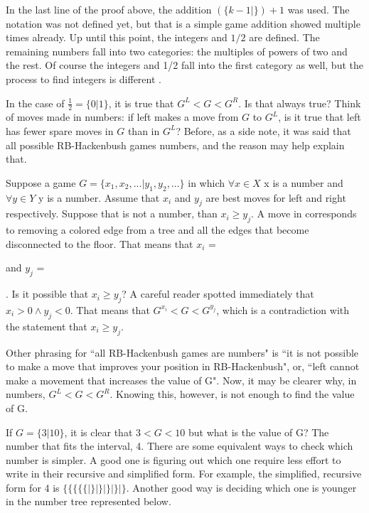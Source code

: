 In the last line of the proof above, the addition $(\{k-1 |\}) + 1$ was used. The notation was not defined yet, but that is a simple game addition showed multiple times already. Up until this point, the integers and $1/2$ are defined. The remaining numbers fall into two categories: the multiples of powers of two and the rest. Of course the integers and 1/2 fall into the first category as well, but the process to find integers is different .

In the case of $\frac{1}{2} = \{0 | 1\}$, it is true that $G^L < G < G^R$. Is that always true? Think of moves made in numbers: if left makes a move from $G$ to $G^L$, is it true that left has fewer spare moves in $G$ than in $G^L$? Before, as a side note, it was said that all possible RB-Hackenbush games numbers, and the reason may help explain that.

Suppose a game $G = \{x_1, x_2,... | y_1, y_2, ...\}$ in which $\forall x \in X$ x  is a number and $\forall y \in Y$ y is a number. Assume that $x_i$ and $y_j$ are best moves for left and right respectively. Suppose that \Gm{} is not a number, than $x_i \ge y_j$. A move in \Gm corresponds to removing a colored edge from a tree and all the edges that become disconnected to the floor. That means that $x_i$ = 
 and $y_j$ =
. Is it possible that $x_i \ge y_j$? A careful reader spotted immediately that $x_i > 0 \land y_j < 0$. That means that $G^{x_i} < G < G^{y_j}$, which is a contradiction with the statement that $x_i \ge y_j$.

Other phrasing for ``all RB-Hackenbush games are numbers" is ``it is not possible to make a move that improves your position in  RB-Hackenbush", or, ``left cannot make a movement that increases the value of G". Now, it may be clearer why, in numbers, $G^L < G < G^R$. Knowing this, however, is not enough to find the value of G.

If $G = \{3 | 10\}$, it is clear that $3 < G < 10$ but what is the value of G? The  number that fits the interval, 4. There are some equivalent ways to check which number is simpler. A good one is figuring out which one require less effort to write in their recursive and simplified form. For example, the simplified, recursive form for 4 is $\{\{\{\{\{|\}|\}|\}|\} | \}$. Another good way is deciding which one is younger in the number tree represented below.

